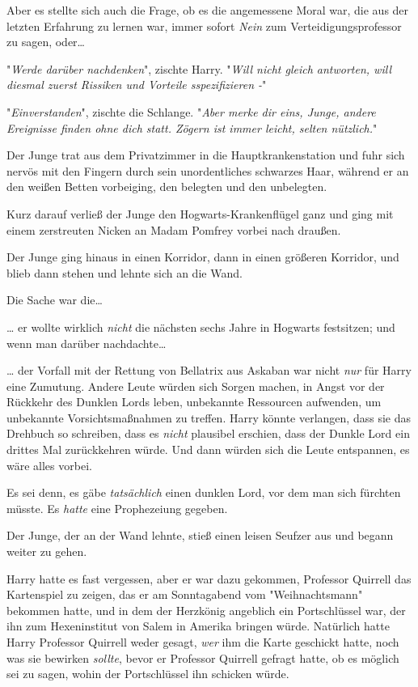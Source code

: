 {Aber es stellte sich auch die Frage, ob es die angemessene Moral war, die aus der letzten Erfahrung zu lernen war, immer sofort \emph{Nein} zum Verteidigungsprofessor zu sagen, oder…

"\emph{Werde darüber nachdenken}", zischte Harry. "\emph{Will nicht gleich antworten, will diesmal zuerst Rissiken und Vorteile sspezifizieren -}"

"\emph{Einverstanden}", zischte die Schlange. "\emph{Aber merke dir eins, Junge, andere Ereignisse finden ohne dich statt. Zögern ist immer leicht, selten nützlich.}"

Der Junge trat aus dem Privatzimmer in die Hauptkrankenstation und fuhr sich nervös mit den Fingern durch sein unordentliches schwarzes Haar, während er an den weißen Betten vorbeiging, den belegten und den unbelegten.

Kurz darauf verließ der Junge den Hogwarts-Krankenflügel ganz und ging mit einem zerstreuten Nicken an Madam Pomfrey vorbei nach draußen.

Der Junge ging hinaus in einen Korridor, dann in einen größeren Korridor, und blieb dann stehen und lehnte sich an die Wand.

Die Sache war die…

… er wollte wirklich \emph{nicht} die nächsten sechs Jahre in Hogwarts festsitzen; und wenn man darüber nachdachte…

… der Vorfall mit der Rettung von Bellatrix aus Askaban war nicht \emph{nur} für Harry eine Zumutung. Andere Leute würden sich Sorgen machen, in Angst vor der Rückkehr des Dunklen Lords leben, unbekannte Ressourcen aufwenden, um unbekannte Vorsichtsmaßnahmen zu treffen. Harry könnte verlangen, dass sie das Drehbuch so schreiben, dass es \emph{nicht} plausibel erschien, dass der Dunkle Lord ein drittes Mal zurückkehren würde. Und dann würden sich die Leute entspannen, es wäre alles vorbei.

Es sei denn, es gäbe \emph{tatsächlich} einen dunklen Lord, vor dem man sich fürchten müsste. Es \emph{hatte} eine Prophezeiung gegeben.

Der Junge, der an der Wand lehnte, stieß einen leisen Seufzer aus und begann weiter zu gehen.

Harry hatte es fast vergessen, aber er war dazu gekommen, Professor Quirrell das Kartenspiel zu zeigen, das er am Sonntagabend vom "Weihnachtsmann" bekommen hatte, und in dem der Herzkönig angeblich ein Portschlüssel war, der ihn zum Hexeninstitut von Salem in Amerika bringen würde. Natürlich hatte Harry Professor Quirrell weder gesagt, \emph{wer} ihm die Karte geschickt hatte, noch was sie bewirken \emph{sollte}, bevor er Professor Quirrell gefragt hatte, ob es möglich sei zu sagen, wohin der Portschlüssel ihn schicken würde.

}
